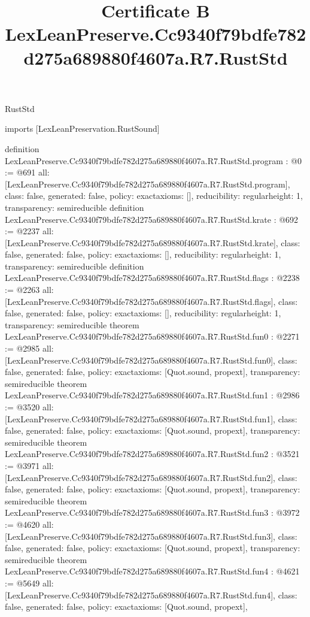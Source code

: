 \begin{lexlean}{RustStd}
\title{Certificate B LexLeanPreserve.Cc9340f79bdfe782d275a689880f4607a.R7.RustStd}
\begin{coremodule}
imports [LexLeanPreservation.RustSound]

definition LexLeanPreserve.Cc9340f79bdfe782d275a689880f4607a.R7.RustStd.program : @0 := @691 {
  all: [LexLeanPreserve.Cc9340f79bdfe782d275a689880f4607a.R7.RustStd.program],
  class: false,
  generated: false,
  policy: exact{axioms: []},
  reducibility: regular{height: 1},
  transparency: semireducible
}
definition LexLeanPreserve.Cc9340f79bdfe782d275a689880f4607a.R7.RustStd.krate : @692 := @2237 {
  all: [LexLeanPreserve.Cc9340f79bdfe782d275a689880f4607a.R7.RustStd.krate],
  class: false,
  generated: false,
  policy: exact{axioms: []},
  reducibility: regular{height: 1},
  transparency: semireducible
}
definition LexLeanPreserve.Cc9340f79bdfe782d275a689880f4607a.R7.RustStd.flags : @2238 := @2263 {
  all: [LexLeanPreserve.Cc9340f79bdfe782d275a689880f4607a.R7.RustStd.flags],
  class: false,
  generated: false,
  policy: exact{axioms: []},
  reducibility: regular{height: 1},
  transparency: semireducible
}
theorem LexLeanPreserve.Cc9340f79bdfe782d275a689880f4607a.R7.RustStd.fun0 : @2271 := @2985 {
  all: [LexLeanPreserve.Cc9340f79bdfe782d275a689880f4607a.R7.RustStd.fun0],
  class: false,
  generated: false,
  policy: exact{axioms: [Quot.sound, propext]},
  transparency: semireducible
}
theorem LexLeanPreserve.Cc9340f79bdfe782d275a689880f4607a.R7.RustStd.fun1 : @2986 := @3520 {
  all: [LexLeanPreserve.Cc9340f79bdfe782d275a689880f4607a.R7.RustStd.fun1],
  class: false,
  generated: false,
  policy: exact{axioms: [Quot.sound, propext]},
  transparency: semireducible
}
theorem LexLeanPreserve.Cc9340f79bdfe782d275a689880f4607a.R7.RustStd.fun2 : @3521 := @3971 {
  all: [LexLeanPreserve.Cc9340f79bdfe782d275a689880f4607a.R7.RustStd.fun2],
  class: false,
  generated: false,
  policy: exact{axioms: [Quot.sound, propext]},
  transparency: semireducible
}
theorem LexLeanPreserve.Cc9340f79bdfe782d275a689880f4607a.R7.RustStd.fun3 : @3972 := @4620 {
  all: [LexLeanPreserve.Cc9340f79bdfe782d275a689880f4607a.R7.RustStd.fun3],
  class: false,
  generated: false,
  policy: exact{axioms: [Quot.sound, propext]},
  transparency: semireducible
}
theorem LexLeanPreserve.Cc9340f79bdfe782d275a689880f4607a.R7.RustStd.fun4 : @4621 := @5649 {
  all: [LexLeanPreserve.Cc9340f79bdfe782d275a689880f4607a.R7.RustStd.fun4],
  class: false,
  generated: false,
  policy: exact{axioms: [Quot.sound, propext]},
}
\end{coremodule}
\end{lexlean}
